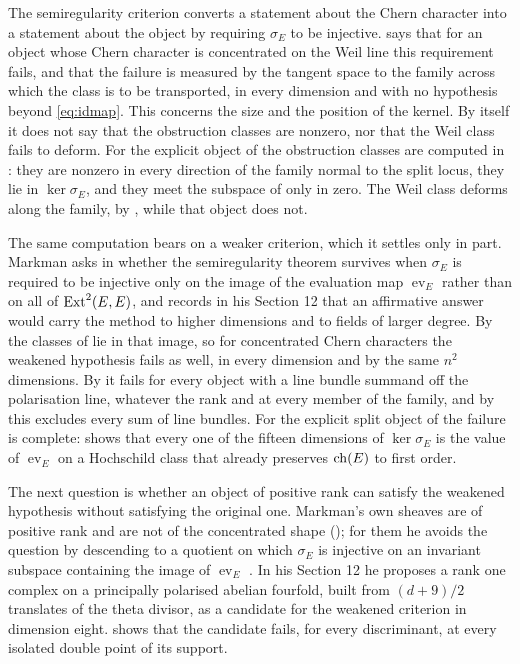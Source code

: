\begin{remark}
\label{rem:whatmeasures}
The semiregularity criterion converts a statement about the Chern character
into a statement about the object by requiring $\sigma_{E}$ to be injective.
 says that for an object whose Chern character is
concentrated on the Weil line this requirement fails, and that the failure is
measured by the tangent space to the family across which the class is to be
transported, in every dimension and with no hypothesis beyond
\eqref{eq:idmap}. This concerns the size and the position of the kernel. By
itself it does not say that the obstruction classes are nonzero, nor that
the Weil class fails to deform. For the explicit object of
 the obstruction classes are computed in
: they are nonzero in every direction of the
family normal to the split locus, they lie in $\ker\sigma_{E}$, and they meet
the subspace of  only in zero. The Weil class deforms
along the family, by , while that object does not.

The same computation bears on a weaker criterion, which it settles only in
part. Markman asks in \cite[Question 11.4]{Mar25b} whether the
semiregularity theorem survives when $\sigma_{E}$ is required to be injective
only on the image of the evaluation map $\operatorname{ev}_{E}$ rather than
on all of $\operatorname{Ext}^{2}(E,E)$, and records in his Section 12 that an affirmative
answer would carry the method to higher dimensions and to fields of larger
degree. By  the classes of  lie in
that image, so for concentrated Chern characters the weakened hypothesis
fails as well, in every dimension and by the same $n^{2}$ dimensions. By
 it fails for every object with a line bundle summand
off the polarisation line, whatever the rank and at every member of the
family, and by  this excludes every sum of line bundles.
For the explicit split object of  the failure is
complete:  shows that every one of the fifteen
dimensions of $\ker\sigma_{E}$ is the value of $\operatorname{ev}_{E}$ on a
Hochschild class that already preserves $\operatorname{ch}(E)$ to first order.

The next question is whether an object of positive rank can satisfy the
weakened hypothesis without satisfying the original one. Markman's own
sheaves are of positive rank and are not of the concentrated shape
(); for them he avoids the question by descending to
a quotient on which $\sigma_{E}$ is injective on an invariant subspace
containing the image of $\operatorname{ev}_{E}$
\cite[Proposition~11.5]{Mar25b}. In his Section 12 he proposes a rank one
complex on a principally polarised abelian fourfold, built from $(d+9)/2$
translates of the theta divisor, as a candidate for the weakened criterion in
dimension eight. 
shows that the candidate fails, for every discriminant, at every isolated
double point of its support.


\end{remark}
